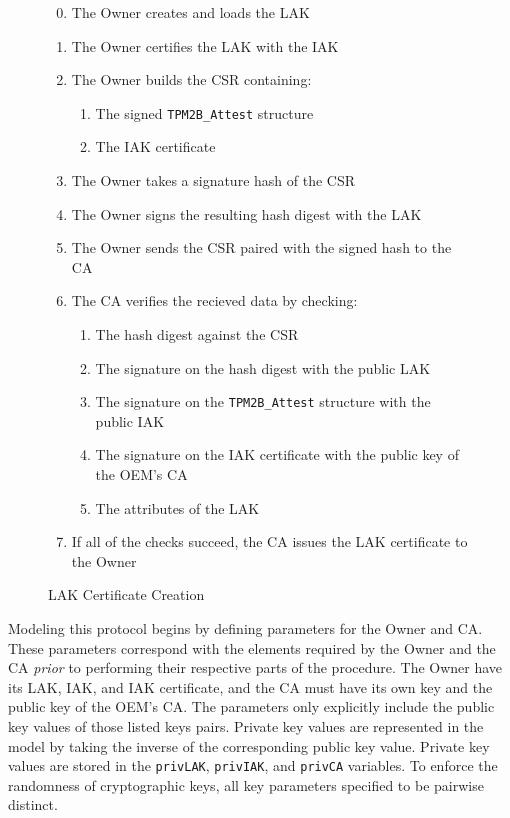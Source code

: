 \documentclass[runningheads]{llncs}
\begin{document}
\begin{figure}[hpbt]
\begin{enumerate}[itemsep=0pt,parsep=0pt,partopsep=0pt]
  \setcounter{enumi}{-1}
  \item The Owner creates and loads the LAK
  \item The Owner certifies the LAK with the IAK
  \item The Owner builds the CSR containing:
  \begin{enumerate}[topsep=0pt, itemsep=0pt,parsep=0pt,partopsep=0pt]
    \item The signed \verb|TPM2B_Attest| structure
    \item The IAK certificate
  \end{enumerate}
  \item The Owner takes a signature hash of the CSR
  \item The Owner signs the resulting hash digest with the LAK
  \item The Owner sends the CSR paired with the signed hash to the CA
  \item The CA verifies the recieved data by checking:
  \begin{enumerate}[topsep=0pt, itemsep=0pt,parsep=0pt,partopsep=0pt]
    \item The hash digest against the CSR
    \item The signature on the hash digest with the public LAK
    \item The signature on the \verb|TPM2B_Attest| structure with the public IAK
    \item The signature on the IAK certificate with the public key of the OEM's CA
    \item The attributes of the LAK
  \end{enumerate}
  \item If all of the checks succeed, the CA issues the LAK certificate to the Owner
  \end{enumerate}
  \caption{LAK Certificate Creation}
  \label{fig:lak-certificate-creation}
\end{figure}

Modeling this protocol begins by defining parameters for the Owner and
CA. These parameters correspond with the elements required by the
Owner and the CA \emph{prior} to performing their respective parts of
the procedure.  The Owner have its LAK, IAK, and IAK certificate, and
the CA must have its own key and the public key of the OEM's CA. The
parameters only explicitly include the public key values of those
listed keys pairs. Private key values are represented in the model by
taking the inverse of the corresponding public key value. Private key
values are stored in the \verb|privLAK|, \verb|privIAK|, and
\verb|privCA| variables. To enforce the randomness of cryptographic
keys, all key parameters specified to be pairwise distinct.
\end{document}
